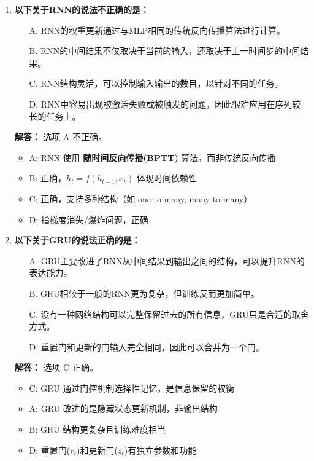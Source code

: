 \documentclass[a4paper,12pt]{book}
\begin{document}
\begin{enumerate}[label=\arabic*.]
    \item \textbf{以下关于RNN的说法不正确的是：}
    \begin{itemize}
        \item[A.] RNN的权重更新通过与MLP相同的传统反向传播算法进行计算。
        \item[B.] RNN的中间结果不仅取决于当前的输入，还取决于上一时间步的中间结果。
        \item[C.] RNN结构灵活，可以控制输入输出的数目，以针对不同的任务。
        \item[D.] RNN中容易出现被激活失败或被触发的问题，因此很难应用在序列较长的任务上。
    \end{itemize}
    
    \textbf{解答：} 选项 A 不正确。\\
    \begin{itemize}
        \item A: RNN 使用 \textbf{随时间反向传播(BPTT)} 算法，而非传统反向传播
        \item B: 正确，$h_t = f(h_{t-1}, x_t)$ 体现时间依赖性
        \item C: 正确，支持多种结构（如 one-to-many, many-to-many）
        \item D: 指梯度消失/爆炸问题，正确
    \end{itemize}
    
    \item \textbf{以下关于GRU的说法正确的是：}
    \begin{itemize}
        \item[A.] GRU主要改进了RNN从中间结果到输出之间的结构，可以提升RNN的表达能力。
        \item[B.] GRU相较于一般的RNN更为复杂，但训练反而更加简单。
        \item[C.] 没有一种网络结构可以完整保留过去的所有信息，GRU只是合适的取舍方式。
        \item[D.] 重置门和更新的门输入完全相同，因此可以合并为一个门。
    \end{itemize}
    
    \textbf{解答：} 选项 C 正确。\\
    \begin{itemize}
        \item C: GRU 通过门控机制选择性记忆，是信息保留的权衡
        \item A: GRU 改进的是隐藏状态更新机制，非输出结构
        \item B: GRU 结构更复杂且训练难度相当
        \item D: 重置门($r_t$)和更新门($z_t$)有独立参数和功能
    \end{itemize}
    

\end{enumerate}
\end{document}
